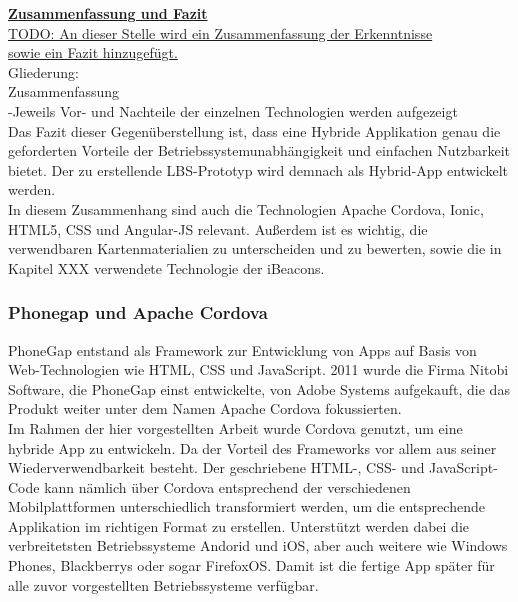 \textbf{\underline{Zusammenfassung und Fazit}}\\





\underline{TODO: An dieser Stelle wird ein Zusammenfassung der Erkenntnisse }\\
\underline{sowie ein Fazit hinzugefügt.}
\\Gliederung:
\\Zusammenfassung
\\-Jeweils Vor- und Nachteile der einzelnen Technologien werden aufgezeigt
\\
Das Fazit dieser Gegenüberstellung ist, dass eine Hybride Applikation genau die geforderten Vorteile der Betriebssystemunabhängigkeit und einfachen Nutzbarkeit bietet. Der zu erstellende LBS-Prototyp wird demnach als Hybrid-App entwickelt werden.
\\
In diesem Zusammenhang sind auch die Technologien Apache Cordova, Ionic, HTML5, CSS und Angular-JS relevant. Außerdem ist es wichtig, die verwendbaren Kartenmaterialien zu unterscheiden und zu bewerten, sowie die in Kapitel XXX verwendete Technologie der iBeacons.

\subsubsection{Phonegap und Apache Cordova}
PhoneGap entstand als Framework zur Entwicklung von Apps auf Basis von Web-Technologien wie HTML, CSS und JavaScript. 2011 wurde die Firma Nitobi Software, die PhoneGap einst entwickelte, von Adobe Systems aufgekauft, die das Produkt weiter unter dem Namen Apache Cordova fokussierten. 
\\
Im Rahmen der hier vorgestellten Arbeit wurde Cordova genutzt, um eine hybride App zu entwickeln. Da der Vorteil des Frameworks vor allem aus seiner Wiederverwendbarkeit besteht. Der geschriebene HTML-, CSS- und JavaScript-Code kann nämlich über Cordova entsprechend der verschiedenen Mobilplattformen unterschiedlich transformiert werden, um die entsprechende Applikation im richtigen Format zu erstellen. Unterstützt werden dabei die verbreitetsten Betriebssysteme Andorid und iOS, aber auch weitere wie Windows Phones, Blackberrys oder sogar FirefoxOS. Damit ist die fertige App später für alle zuvor vorgestellten Betriebssysteme verfügbar.


